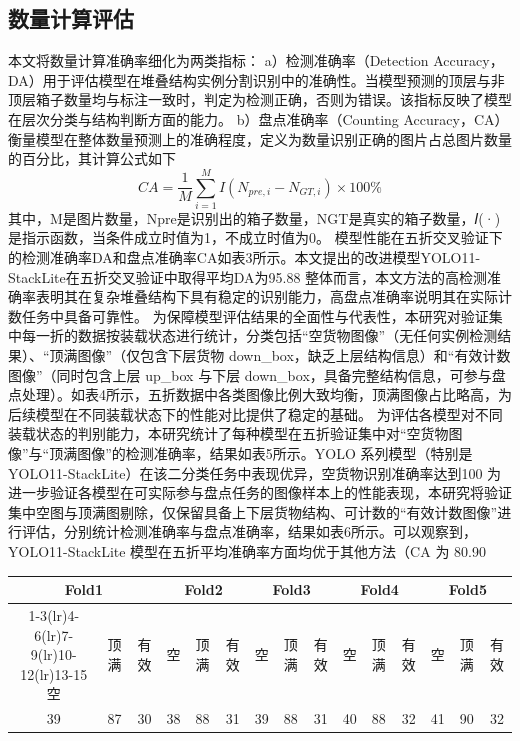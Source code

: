 \subsection{数量计算评估}{}
本文将数量计算准确率细化为两类指标：
a）检测准确率（Detection Accuracy，DA）用于评估模型在堆叠结构实例分割识别中的准确性。当模型预测的顶层与非顶层箱子数量均与标注一致时，判定为检测正确，否则为错误。该指标反映了模型在层次分类与结构判断方面的能力。
b）盘点准确率（Counting Accuracy，CA）衡量模型在整体数量预测上的准确程度，定义为数量识别正确的图片占总图片数量的百分比，其计算公式如下
\[CA = \frac{1}{M}\sum\limits_{i = 1}^M {I({N_{pre,i}} - {N_{GT,i}})}  \times 100\% \]
其中，M是图片数量，Npre是识别出的箱子数量，NGT是真实的箱子数量，𝐼(·)是指示函数，当条件成立时值为1，不成立时值为0。 
模型性能在五折交叉验证下的检测准确率DA和盘点准确率CA如表3所示。本文提出的改进模型YOLO11-StackLite在五折交叉验证中取得平均DA为95.88%
整体而言，本文方法的高检测准确率表明其在复杂堆叠结构下具有稳定的识别能力，高盘点准确率说明其在实际计数任务中具备可靠性。 
为保障模型评估结果的全面性与代表性，本研究对验证集中每一折的数据按装载状态进行统计，分类包括“空货物图像”（无任何实例检测结果）、“顶满图像”（仅包含下层货物 down_box，缺乏上层结构信息）和“有效计数图像”（同时包含上层 up_box 与下层 down_box，具备完整结构信息，可参与盘点处理）。如表4所示，五折数据中各类图像比例大致均衡，顶满图像占比略高，为后续模型在不同装载状态下的性能对比提供了稳定的基础。
为评估各模型对不同装载状态的判别能力，本研究统计了每种模型在五折验证集中对“空货物图像”与“顶满图像”的检测准确率，结果如表5所示。YOLO 系列模型（特别是 YOLO11-StackLite）在该二分类任务中表现优异，空货物识别准确率达到100%
为进一步验证各模型在可实际参与盘点任务的图像样本上的性能表现，本研究将验证集中空图与顶满图剔除，仅保留具备上下层货物结构、可计数的“有效计数图像”进行评估，分别统计检测准确率与盘点准确率，结果如表6所示。可以观察到，YOLO11-StackLite 模型在五折平均准确率方面均优于其他方法（CA 为 80.90%
\begin{table}
  \label{tab:data_distribution}
  \centering
  \begin{tabular}{ccccccccccccccc}
    \toprule
    \multicolumn{3}{c}{Fold1} & \multicolumn{3}{c}{Fold2} & \multicolumn{3}{c}{Fold3} & \multicolumn{3}{c}{Fold4} & \multicolumn{3}{c}{Fold5} \\
    \cmidrule(lr){1-3}\cmidrule(lr){4-6}\cmidrule(lr){7-9}\cmidrule(lr){10-12}\cmidrule(lr){13-15}
    空 & 顶满 & 有效 & 空 & 顶满 & 有效 & 空 & 顶满 & 有效 & 空 & 顶满 & 有效 & 空 & 顶满 & 有效 \\
    \midrule
    39 & 87 & 30 & 38 & 88 & 31 & 39 & 88 & 31 & 40 & 88 & 32 & 41 & 90 & 32 \\
    \bottomrule
  \end{tabular}
\end{table}
